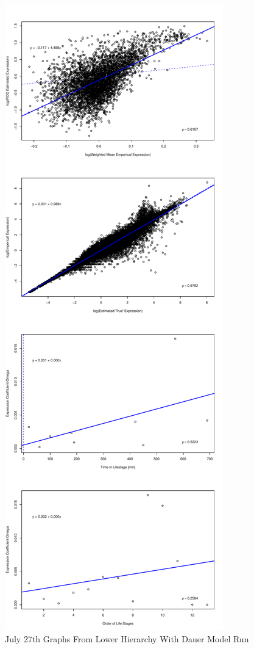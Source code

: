 \documentclass[letterpaper,index=totoc,hyperref,openany]{labbook} %
\begin{document}
\begin{figure}[H]
\begin{center}
\includegraphics[scale=.45]{../C_Elegans/Lower_Hierarchy_With_Dauer_1/Plots/lower_hierarchy_with_dauer_original_model_celegans_weighted_expr_vector_beta_noise_fixed_sroc_withIntercept.pdf}
\end{center}
\caption{July 27th Graphs From Lower Hierarchy With Dauer Model Run}
\end{figure}
\end{document}

